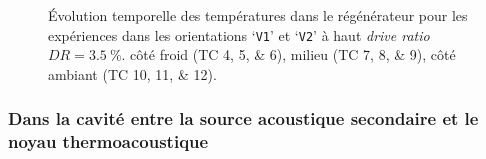 %    

\begin{figure}[!ht]
    \centering
	\begin{subfigure}{\textwidth}
		\centering
    	
		\caption{}
		\label{fig:Acou_CHXin_V1V2_High}
	\end{subfigure}		
	\begin{subfigure}{\textwidth}
		\centering
    	
		\caption{}
		\label{fig:Acou_Regmid_V1V2_High}
	\end{subfigure}		
	\begin{subfigure}{\textwidth}
		\centering
    	
		\caption{}
		\label{fig:Acou_AHXin_V1V2_High}
	\end{subfigure}		
    \caption{\'Evolution temporelle des températures dans le régénérateur pour les expériences dans les orientations `\texttt{V1}' et `\texttt{V2}' à haut \textit{drive ratio} $DR=\qty{3.5}{\percent}$.  côté froid (TC \numlist{4;5;6}),  milieu (TC \numlist{7;8;9}),  côté ambiant (TC \numlist{10;11;12}).}
    \label{fig:Acou_V1V2_High}
\end{figure}

\subsubsection{Dans la cavité entre la source acoustique secondaire et le noyau thermoacoustique}

%    
%
%    

